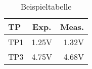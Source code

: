 \begin{table}[h!]
  \centering
  \begin{tabular}{l|c|r}
    TP  & Exp.  & Meas. \\
    \hline
    TP1 & 1.25V & 1.32V \\
    TP3 & 4.75V & 4.68V \\
  \end{tabular}
  \caption{Beispieltabelle}
  \label{tab:example}
\end{table}
